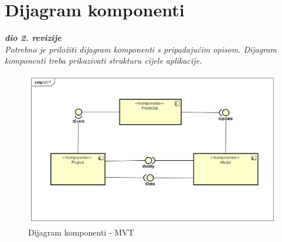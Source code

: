			 \eject
			
			\eject
		\section{Dijagram komponenti}
		
			\textbf{\textit{dio 2. revizije}}\\
		
			 \textit{Potrebno je priložiti dijagram komponenti s pripadajućim opisom. Dijagram komponenti treba prikazivati strukturu cijele aplikacije.}

			\begin{figure}[H]
			 	\includegraphics[width= 15 cm, height= 25 cm, keepaspectratio]{dijagrami/Component_Diagram_MVT.png} 
			 	\centering
			 	\caption{Dijagram komponenti - MVT}
			 	\label{fig:act4}
			 \end{figure}

